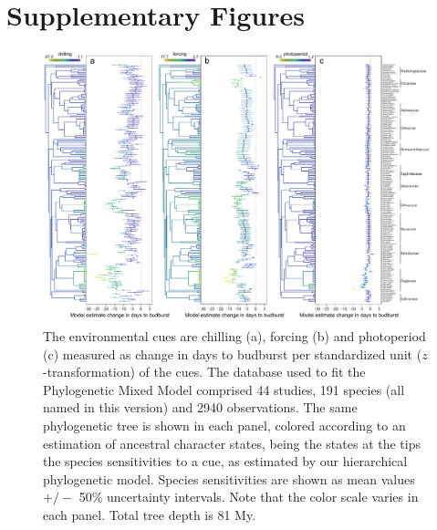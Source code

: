 \documentclass[11pt]{article}
\begin{document}
\section{Supplementary Figures}

\begin{figure}
  \begin{center}
  \includegraphics[width=16cm]{../../analyses/phylogeny/figures/Fig1_phylo_muplots191_clades.pdf}
  \caption{ The environmental cues are chilling (a), forcing (b) and photoperiod (c) measured as change in days to budburst per standardized unit ($z$-transformation) of the cues. The database used to fit the Phylogenetic Mixed Model comprised 44 studies, 191 species (all named in this version) and 2940 observations. The same phylogenetic tree is shown in each panel, colored according to an estimation of ancestral character states, being the states at the tips the species sensitivities to a cue, as estimated by our hierarchical phylogenetic model. Species sensitivities are shown as mean values $+/-$ 50\% uncertainty intervals. Note that the color scale varies in each panel. Total tree depth is 81 My.}
    \label{fig:muplot191names}
    \end{center}
\end{figure}
\clearpage
\end{document}
